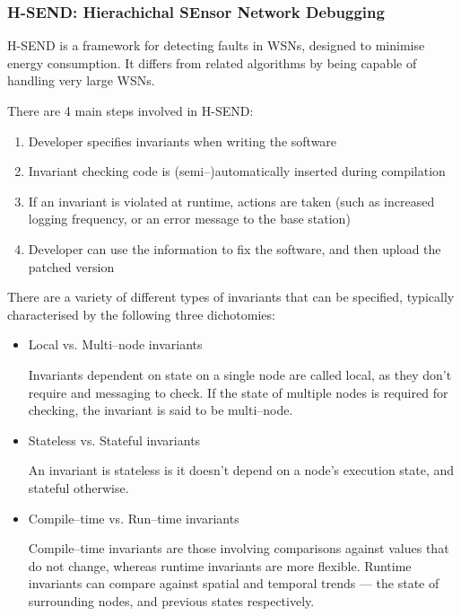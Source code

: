 \subsubsection*{H-SEND: Hierachichal SEnsor Network Debugging}

H-SEND is a framework for detecting faults in WSNs, designed to minimise energy consumption. It differs from related algorithms by being capable of handling very large WSNs. \cite{herbert2007adaptive}

There are 4 main steps involved in H-SEND:

\begin{enumerate}
	\item Developer specifies invariants when writing the software
	\item Invariant checking code is (semi--)automatically inserted during compilation
	\item If an invariant is violated at runtime, actions are taken (such as increased logging frequency, or an error message to the base station)
	\item Developer can use the information to fix the software, and then upload the patched version
\end{enumerate}

There are a variety of different types of invariants that can be specified, typically characterised by the following three dichotomies:

\begin{itemize}
	\item Local vs. Multi--node invariants
	
	Invariants dependent on state on a single node are called local, as they don't require and messaging to check. If the state of multiple nodes is required for checking, the invariant is said to be multi--node.

	\item Stateless vs. Stateful invariants
	
	An invariant is stateless is it doesn't depend on a node's execution state, and stateful otherwise.

	\item Compile--time vs. Run--time invariants

	Compile--time invariants are those involving comparisons against values that do not change, whereas runtime invariants are more flexible. Runtime invariants can compare against spatial and temporal trends ---  the state of surrounding nodes, and previous states respectively.
\end{itemize}

